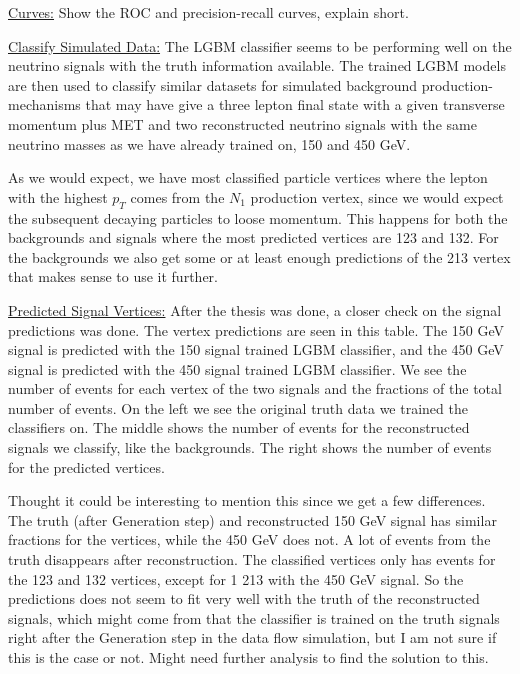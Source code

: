 \documentclass[a4paper, american, 12pt]{report}
\begin{document}
	
	\underline{Curves:}
	Show the ROC and precision-recall curves, explain short.
	
	
	\underline{Classify Simulated Data:}
	The LGBM classifier seems to be performing well on the neutrino signals with the truth information available. The trained LGBM models are then used to classify similar datasets for simulated background production-mechanisms that may have give a three lepton  final state with a given transverse momentum plus MET and two reconstructed neutrino signals with the same neutrino masses as we have already trained on, 150 and 450 GeV.
	
	As we would expect, we have most classified particle vertices where the lepton with the highest $p_T$ comes from the $N_1$ production vertex, since we would expect the subsequent decaying particles to loose momentum. This happens for both the backgrounds and signals where the most predicted vertices are 123 and 132. For the backgrounds we also get some or at least enough predictions of the 213 vertex that makes sense to use it further.
	
	
	\underline{Predicted Signal Vertices:}
	After the thesis was done, a closer check on the signal predictions was done. The vertex predictions are seen in this table. The 150 GeV signal is predicted with the 150 signal trained LGBM classifier, and the 450 GeV signal is predicted with the 450 signal trained LGBM classifier. We see the number of events for each vertex of the two signals and the fractions of the total number of events. On the left we see the original truth data we trained the classifiers on. The middle shows the number of events for the reconstructed signals we classify, like the backgrounds. The right shows the number of events for the predicted vertices.
	
	Thought it could be interesting to mention this since we get a few differences. The truth (after Generation step) and reconstructed 150 GeV signal has similar fractions for the vertices, while the 450 GeV does not. A lot of events from the truth disappears after reconstruction. The classified vertices only has events for the 123 and 132 vertices, except for 1 213 with the 450 GeV signal. So the predictions does not seem to fit very well with the truth of the reconstructed signals, which might come from that the classifier is trained on the truth signals right after the Generation step in the data flow simulation, but I am not sure if this is the case or not. Might need further analysis to find the solution to this.
	
\end{document}
